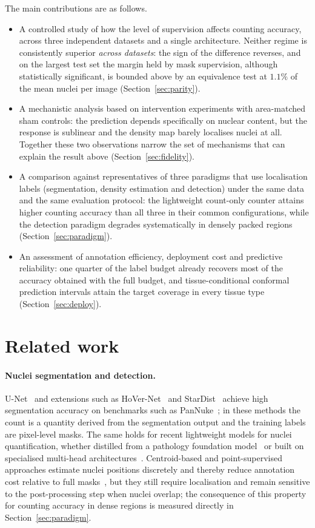 \documentclass[pdflatex,sn-mathphys-num]{sn-jnl}
\begin{document}
The main contributions are as follows.
\begin{itemize}
\item A controlled study of how the level of supervision affects counting accuracy, across three independent
datasets and a single architecture. Neither regime is consistently superior \emph{across datasets}: the sign of
the difference reverses, and on the largest test set the margin held by mask supervision, although
statistically significant, is bounded above by an equivalence test at $1.1\%$ of the mean nuclei per image
(Section~\ref{sec:parity}).
\item A mechanistic analysis based on intervention experiments with area-matched sham controls: the prediction
depends specifically on nuclear content, but the response is sublinear and the density map barely localises
nuclei at all. Together these two observations narrow the set of mechanisms that can explain the result above
(Section~\ref{sec:fidelity}).
\item A comparison against representatives of three paradigms that use localisation labels (segmentation,
density estimation and detection) under the same data and the same evaluation protocol: the lightweight
count-only counter attains higher counting accuracy than all three in their common configurations, while the
detection paradigm degrades systematically in densely packed regions (Section~\ref{sec:paradigm}).
\item An assessment of annotation efficiency, deployment cost and predictive reliability: one quarter of the
label budget already recovers most of the accuracy obtained with the full budget, and tissue-conditional
conformal prediction intervals attain the target coverage in every tissue type (Section~\ref{sec:deploy}).
\end{itemize}

\section{Related work}\label{sec:related}

\paragraph{Nuclei segmentation and detection.} U-Net~\cite{unet} and extensions such as
HoVer-Net~\cite{hovernet} and StarDist~\cite{stardist} achieve high segmentation accuracy on benchmarks such as
PanNuke~\cite{pannuke}; in these methods the count is a quantity derived from the segmentation output and the
training labels are pixel-level masks. The same holds for recent lightweight models for nuclei quantification,
whether distilled from a pathology foundation model~\cite{distillfm} or built on specialised multi-head
architectures~\cite{kongnet}. Centroid-based and point-supervised approaches estimate nuclei positions
discretely and thereby reduce annotation cost relative to full masks~\cite{qu2020}, but they still require
localisation and remain sensitive to the post-processing step when nuclei overlap; the consequence of this
property for counting accuracy in dense regions is measured directly in Section~\ref{sec:paradigm}.
\end{document}
